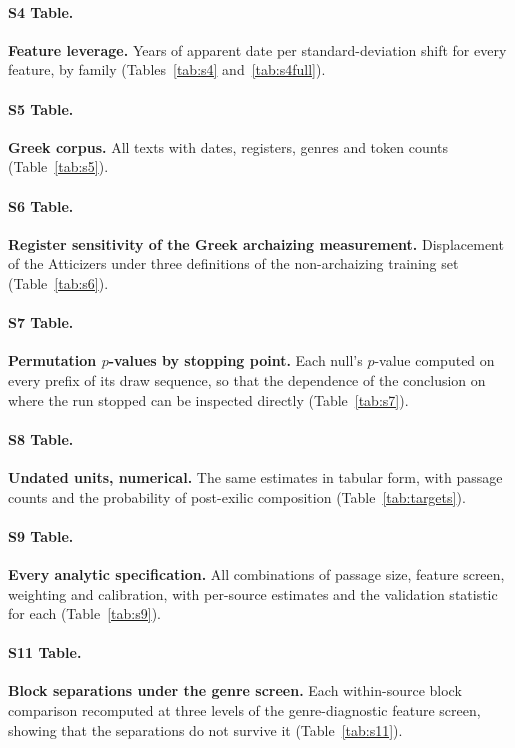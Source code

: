 \documentclass[10pt,letterpaper]{article}
\begin{document}
\paragraph*{S4 Table.}
\label{S4_Table}
{\bf Feature leverage.}  Years of apparent date per standard-deviation shift
for every feature, by family (Tables~\ref{tab:s4} and~\ref{tab:s4full}).

\paragraph*{S5 Table.}
\label{S5_Table}
{\bf Greek corpus.}  All texts with dates, registers, genres and token counts
(Table~\ref{tab:s5}).

\paragraph*{S6 Table.}
\label{S6_Table}
{\bf Register sensitivity of the Greek archaizing measurement.}  Displacement
of the Atticizers under three definitions of the non-archaizing training set
(Table~\ref{tab:s6}).

\paragraph*{S7 Table.}
\label{S7_Table}
{\bf Permutation $p$-values by stopping point.}  Each null's $p$-value
computed on every prefix of its draw sequence, so that the dependence of the
conclusion on where the run stopped can be inspected directly
(Table~\ref{tab:s7}).

\paragraph*{S8 Table.}
\label{S8_Table}
{\bf Undated units, numerical.}  The same estimates in tabular form, with
passage counts and the probability of post-exilic composition
(Table~\ref{tab:targets}).

\paragraph*{S9 Table.}
\label{S9_Table}
{\bf Every analytic specification.}  All \SPtotal{} combinations of passage
size, feature screen, weighting and calibration, with per-source estimates and
the validation statistic for each (Table~\ref{tab:s9}).

\paragraph*{S11 Table.}
\label{S11_Table}
{\bf Block separations under the genre screen.}  Each within-source block
comparison recomputed at three levels of the genre-diagnostic feature screen,
showing that the separations do not survive it (Table~\ref{tab:s11}).
\end{document}
